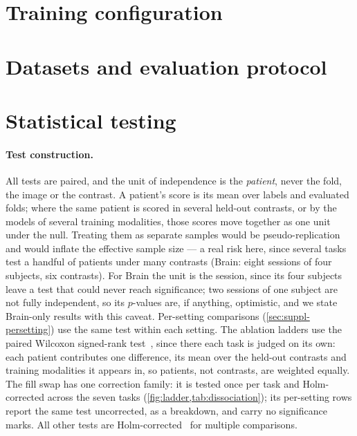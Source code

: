 \clearpage
\setcounter{page}{1}
\maketitlesupplementary

\section{Training configuration}
\label{sec:suppl-config}



\FloatBarrier
\section{Datasets and evaluation protocol}
\label{sec:suppl-data}



\FloatBarrier
\section{Statistical testing}
\label{sec:suppl-stats}

\paragraph{Test construction.} All tests are paired, and the
unit of independence is the \emph{patient}, never the fold, the image or the
contrast. A patient's score is its mean over labels and evaluated folds; where
the same patient is scored in several held-out contrasts, or by the models of
several training modalities, those scores move together as one unit under the
null. Treating them as separate samples would be pseudo-replication and would
inflate the effective sample size --- a real risk here, since several tasks
test a handful of patients under many contrasts (Brain: eight sessions
of four subjects, six contrasts). For Brain the unit is the session, since
its four subjects leave a test that could never reach significance; two
sessions of one subject are not fully independent, so its $p$-values are, if
anything, optimistic, and we state Brain-only results with this caveat.
Per-setting comparisons (\cref{sec:suppl-persetting}) use the same test within
each setting. The ablation ladders use the paired Wilcoxon signed-rank
test~\cite{wilcoxon1945}, since there each task is judged on its own: each
patient contributes one difference, its mean over the held-out contrasts and
training modalities it appears in, so patients, not contrasts, are weighted
equally. The fill swap has one correction family: it is tested once per task
and Holm-corrected across the seven tasks (\cref{fig:ladder,tab:dissociation});
its per-setting rows report the same test uncorrected, as a breakdown, and
carry no significance marks. All other tests are
Holm-corrected~\cite{holm1979} for multiple comparisons.

